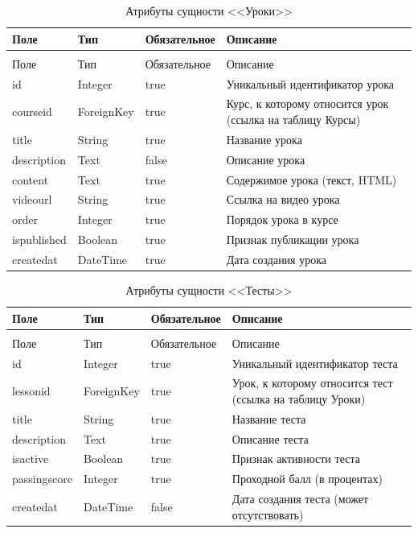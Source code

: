 \begin{xltabular}{\textwidth}{|l|l|p{3.2cm}|X|}
	\caption{Атрибуты сущности <<Уроки>>\label{lessons:table}}\\ \hline
	Поле & Тип & Обязательное & Описание \\ \hline
	\endfirsthead
	\\ \hline
	Поле & Тип & Обязательное & Описание \\ \hline
	\endhead
	id & Integer & true & Уникальный идентификатор урока \\ \hline
	courseid & ForeignKey & true & Курс, к которому относится урок (ссылка на таблицу Курсы) \\ \hline
	title & String & true & Название урока \\ \hline
	description & Text & false & Описание урока \\ \hline
	content & Text & true & Содержимое урока (текст, HTML) \\ \hline
	videourl & String & true & Ссылка на видео урока \\ \hline
	order & Integer & true & Порядок урока в курсе \\ \hline
	ispublished & Boolean & true & Признак публикации урока \\ \hline
	createdat & DateTime & true & Дата создания урока \\ \hline
\end{xltabular}

\begin{xltabular}{\textwidth}{|l|l|p{3.2cm}|X|}
	\caption{Атрибуты сущности <<Тесты>>\label{tests:table}}\\ \hline
	Поле & Тип & Обязательное & Описание \\ \hline
	\endfirsthead
	\\ \hline
	Поле & Тип & Обязательное & Описание \\ \hline
	\endhead
	id & Integer & true & Уникальный идентификатор теста \\ \hline
	lessonid & ForeignKey & true & Урок, к которому относится тест (ссылка на таблицу Уроки) \\ \hline
	title & String & true & Название теста \\ \hline
	description & Text & true & Описание теста \\ \hline
	isactive & Boolean & true & Признак активности теста \\ \hline
	passingscore & Integer & true & Проходной балл (в процентах) \\ \hline
	createdat & DateTime & false & Дата создания теста (может отсутствовать) \\ \hline
\end{xltabular}

